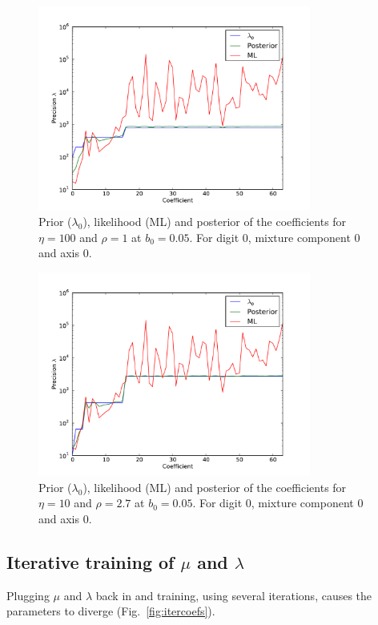 \documentclass{article}
\begin{document}
\begin{figure}
    \centering
    \includegraphics[width=0.8\textwidth]{figs/plotb000-eta100-rho1.pdf}
    \caption{Prior ($\lambda_0$), likelihood (ML) and posterior of the coefficients for $\eta=100$ and $\rho=1$ at $b_0 = 0.05$. For digit 0, mixture component 0 and axis 0.} \label{fig:rho1}
\end{figure}

\begin{figure}
    \centering
    \includegraphics[width=0.8\textwidth]{figs/plotb000-eta10-rho2-7.pdf}
    \caption{Prior ($\lambda_0$), likelihood (ML) and posterior of the coefficients for $\eta=10$ and $\rho=2.7$ at $b_0 = 0.05$. For digit 0, mixture component 0 and axis 0.} \label{fig:rho27}
\end{figure}


\subsection{Iterative training of $\mu$ and $\lambda$}
Plugging $\mu$ and $\lambda$ back in and training, using several iterations, causes the parameters to diverge (Fig.~\ref{fig:itercoefs}).
\end{document}
